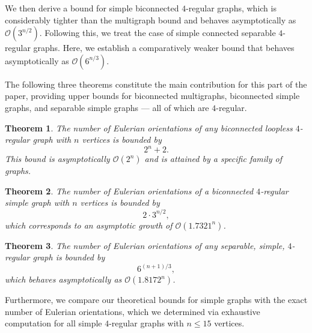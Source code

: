 \documentclass{article}
\newtheorem{theorem}{Theorem}
\begin{document}
        We then derive a bound for simple biconnected $4$-regular graphs, which is considerably tighter than the multigraph bound and behaves asymptotically as $\mathcal{O}\left(3^{n/2}\right)$.
        Following this, we treat the case of simple connected separable $4$-regular graphs. 
        Here, we establish a comparatively weaker bound that behaves asymptotically as $\mathcal{O}\left(6^{n/3}\right)$.

        The following three theorems constitute the main contribution for this part of the paper, providing upper bounds for biconnected multigraphs,  biconnected simple graphs, and separable simple graphs — all of which are $4$-regular.

        \begin{theorem}\label{th:multi_b}
            The number of Eulerian orientations of any biconnected loopless $4$-regular graph with $n$ vertices is bounded by
            \begin{equation*}
                2^n + 2. 
            \end{equation*} 
            This bound is asymptotically $\mathcal{O}(2^n)$ and is attained by a specific family of graphs.
        \end{theorem}

        \begin{theorem}\label{th:bi}
            The number of Eulerian orientations of a biconnected $4$-regular simple graph with $n$ vertices is bounded by
            \begin{equation*} 
                2\cdot 3^{n/2}, 
            \end{equation*} 
            which corresponds to an asymptotic growth of $\mathcal{O}(1.7321^n)$.
        \end{theorem}

        \begin{theorem}\label{th:sep}
            The number of Eulerian orientations of any separable, simple, $4$-regular graph is bounded by
            \begin{equation*}
                6^{(n+1)/3}, 
            \end{equation*} 
            which behaves asymptotically as $\mathcal{O} \left(1.8172^{n} \right)$.
        \end{theorem}

        Furthermore, we compare our theoretical bounds for simple graphs with the exact number of Eulerian orientations, which we determined via exhaustive computation for all simple $4$-regular graphs with $n \leq 15$ vertices.
\end{document}
